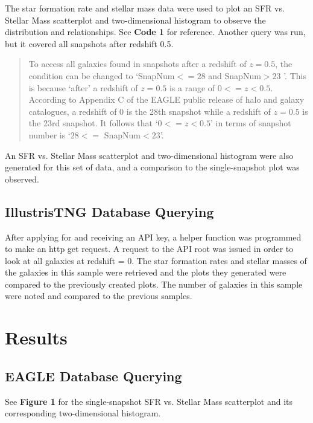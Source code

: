 \documentclass[linenumbers,trackchanges]{aastex7}
\begin{document}
The star formation rate and stellar mass data were used to plot an SFR vs. Stellar Mass scatterplot and two-dimensional histogram to observe the distribution and relationships. See \textbf{Code 1} for reference. Another query was run, but it covered all snapshots after redshift 0.5. 

\begin{quote}
    To access all galaxies found in snapshots after a redshift of $z = 0.5$, the condition can be changed to `SnapNum$ <= 28 $ and SnapNum$ > 23$ '. This is because `after' a redshift of $z = 0.5$ is a range of $0 <= z < 0.5$. According to Appendix C of the EAGLE public release of halo and galaxy catalogues, a redshift of 0 is the 28th snapshot while a redshift of $z = 0.5$ is the 23rd snapshot. It follows that `$0 <= z < 0.5$' in terms of snapshot number is `$28 <= $ SnapNum$ < 23$'.
\end{quote}

An SFR vs. Stellar Mass scatterplot and two-dimensional histogram were also generated for this set of data, and a comparison to the single-snapshot plot was observed. 
\subsection{IllustrisTNG Database Querying}
After applying for and receiving an API key, a helper function was programmed to make an http get request. A request to the API root was issued in order to look at all galaxies at redshift = 0. The star formation rates and stellar masses of the galaxies in this sample were retrieved and the plots they generated were compared to the previously created plots. The number of galaxies in this sample were noted and compared to the previous samples. 




\section{Results}
\subsection{EAGLE Database Querying}
See \textbf{Figure 1 }for the single-snapshot SFR vs. Stellar Mass scatterplot and its corresponding two-dimensional histogram. 
\end{document}
